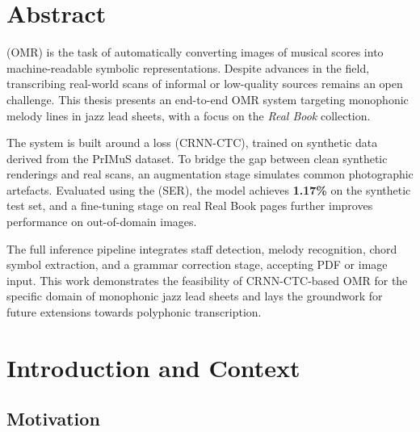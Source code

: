 \documentclass[11pt, a4paper]{report}
\begin{document}
\chapter*{Abstract}

 (OMR) is the task of automatically converting images of musical scores into machine-readable symbolic representations. Despite advances in the field, transcribing real-world scans of informal or low-quality sources remains an open challenge. This thesis presents an end-to-end OMR system targeting monophonic melody lines in jazz lead sheets, with a focus on the \textit{Real Book} collection.

The system is built around a  loss (CRNN-CTC), trained on synthetic data derived from the PrIMuS dataset. To bridge the gap between clean synthetic renderings and real scans, an augmentation stage simulates common photographic artefacts. Evaluated using the  (SER), the model achieves \textbf{1.17\%} on the synthetic test set, and a fine-tuning stage on real Real Book pages further improves performance on out-of-domain images.

The full inference pipeline integrates staff detection, melody recognition, chord symbol extraction, and a grammar correction stage, accepting PDF or image input. This work demonstrates the feasibility of CRNN-CTC-based OMR for the specific domain of monophonic jazz lead sheets and lays the groundwork for future extensions towards polyphonic transcription.

\tableofcontents
\listoffigures
\listoftables
\cleardoublepage



\chapter{Introduction and Context}

\section{Motivation}
\end{document}
